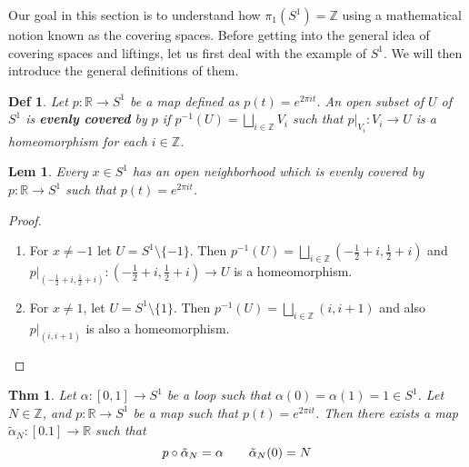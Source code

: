 \documentclass[paper=a4, fontsize=11pt]{scrartcl}
\newcommand{\nextline}{$ $ \newline \vspace{-0.15in}}
\newtheorem{theorem}{Thm}
\newtheorem{definition}{Def}
\newtheorem{lemma}{Lem}
\begin{document}
Our goal in this section is to understand how $\pi_1(S^1) = \mathbb{Z}$ using a mathematical notion known as the covering spaces. Before getting into the general idea of covering spaces and liftings, let us first deal with the example of $S^1$. We will then introduce the general definitions of them.\\

\begin{definition}
Let $p : \mathbb{R} \to S^1$ be a map defined as $p(t)=e^{2\pi i t}$. An open subset of $U$ of $S^1$ is \textbf{evenly covered} by $p$ if $p^{-1}(U)=\bigsqcup\limits_{i \in \mathbb{Z}}V_i$ such that $p|_{V_i} : V_i \to U$ is a homeomorphism for each $i \in \mathbb{Z}$.\\
\end{definition}

\begin{lemma}
	Every $x \in S^1$ has an open neighborhood which is evenly covered by $p : \mathbb{R} \to S^1$ such that $p(t)=e^{2\pi i t}$.\\
\end{lemma}

\begin{proof}
\nextline
\begin{enumerate}
	\item For $x \neq -1$ let $U = S^1 \setminus \{-1\}$. Then $p^{-1}(U)=\bigsqcup\limits_{i \in \mathbb{Z}} \left( -\frac{1}{2}+i,\frac{1}{2}+i \right)$ and $p|_{\left( -\frac{1}{2}+i,\frac{1}{2}+i \right)} : \left( -\frac{1}{2}+i,\frac{1}{2}+i \right) \to U$ is a homeomorphism.
	\item For $x\neq1$, let $U=S^1\setminus\{1\}$. Then $p^{-1}(U)=\bigsqcup\limits_{i \in \mathbb{Z}} \left( i,i+1 \right)$ and also $p|_{\left( i,i+1 \right)}$ is also a homeomorphism.\\
\end{enumerate}
\end{proof}

\begin{theorem}
	Let $\alpha:[0,1]\to S^1$ be a loop such that $\alpha(0)=\alpha(1)=1 \in S^1$. Let $N \in \mathbb{Z}$, and $p:\mathbb{R} \to S^1$ be a map such that $p(t)=e^{2\pi i t}$. Then there exists a map $\tilde{\alpha}_N : [0.1] \to \mathbb{R}$ such that \\
	
	\begin{equation}\nonumber
		p \circ \tilde{\alpha}_N = \alpha \qquad \tilde{\alpha}_N(0) = N\\
	\end{equation}	
\end{theorem}
\vspace{0.15in}
\end{document}
